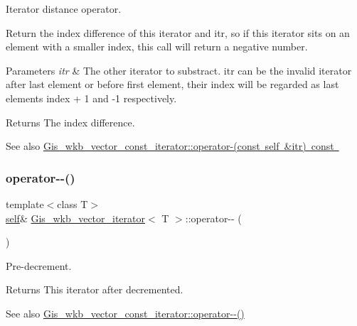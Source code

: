 Iterator distance operator. 

Return the index difference of this iterator and itr, so if this iterator sits on an element with a smaller index, this call will return a negative number. 
\begin{DoxyParams}{Parameters}
{\em itr} & The other iterator to substract. itr can be the invalid iterator after last element or before first element, their index will be regarded as last element\textquotesingle{}s index + 1 and -\/1 respectively. \\
\hline
\end{DoxyParams}
\begin{DoxyReturn}{Returns}
The index difference. 
\end{DoxyReturn}
\begin{DoxySeeAlso}{See also}
\mbox{\hyperlink{classGis__wkb__vector__const__iterator_a9662de5243a456cb63a183214deba0af}{Gis\+\_\+wkb\+\_\+vector\+\_\+const\+\_\+iterator\+::operator-\/(const self \&itr) const }} 
\end{DoxySeeAlso}
\mbox{\label{classGis__wkb__vector__iterator_a919bc700a65a40d88627aec4c9172234}} 
\subsubsection{\texorpdfstring{operator-\/-\/()}{operator--()}\hspace{0.1cm}{\footnotesize\ttfamily [1/2]}}
{\footnotesize\ttfamily template$<$class T$>$ \\
\mbox{\hyperlink{classGis__wkb__vector__const__iterator}{self}}\& \mbox{\hyperlink{classGis__wkb__vector__iterator}{Gis\+\_\+wkb\+\_\+vector\+\_\+iterator}}$<$ T $>$\+::operator-\/-\/ (\begin{DoxyParamCaption}{ }\end{DoxyParamCaption})\hspace{0.3cm}{\ttfamily [inline]}}



Pre-\/decrement. 

\begin{DoxyReturn}{Returns}
This iterator after decremented. 
\end{DoxyReturn}
\begin{DoxySeeAlso}{See also}
\mbox{\hyperlink{classGis__wkb__vector__const__iterator_a62e9c9573e8e44a8521f845da62f0cb2}{Gis\+\_\+wkb\+\_\+vector\+\_\+const\+\_\+iterator\+::operator-\/-\/()}} 
\end{DoxySeeAlso}
\mbox{\label{classGis__wkb__vector__iterator_ad0cb8606fa53e61247e5d18254373844}} 

